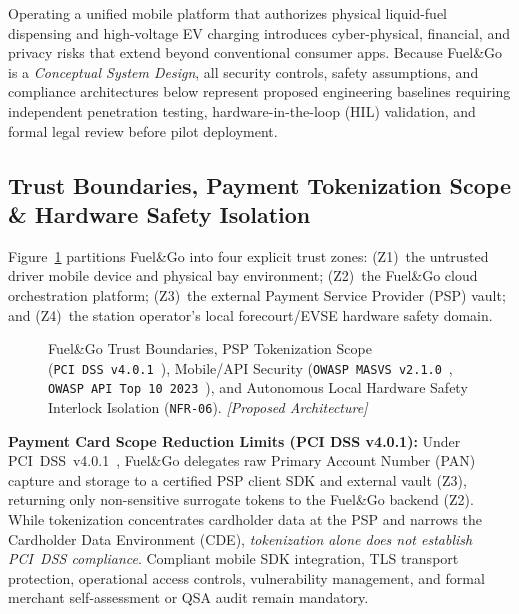 
Operating a unified mobile platform that authorizes physical liquid-fuel dispensing and high-voltage EV charging introduces cyber-physical, financial, and privacy risks that extend beyond conventional consumer apps. Because Fuel\&Go is a \emph{Conceptual System Design}, all security controls, safety assumptions, and compliance architectures below represent proposed engineering baselines requiring independent penetration testing, hardware-in-the-loop (HIL) validation, and formal legal review before pilot deployment.

\subsection{Trust Boundaries, Payment Tokenization Scope \& Hardware Safety Isolation}
Figure~\ref{fig:safety-trust-boundary} partitions Fuel\&Go into four explicit trust zones: (Z1)~the untrusted driver mobile device and physical bay environment; (Z2)~the Fuel\&Go cloud orchestration platform; (Z3)~the external Payment Service Provider (PSP) vault; and (Z4)~the station operator's local forecourt/EVSE hardware safety domain.

\begin{figure}[htbp]
  \centering
  
  \caption{Fuel\&Go Trust Boundaries, PSP Tokenization Scope (\texttt{PCI~DSS~v4.0.1}~\cite{pcissc2024pcidss401}), Mobile/API Security (\texttt{OWASP MASVS~v2.1.0}~\cite{owasp2024masvs}, \texttt{OWASP API Top~10~2023}~\cite{owasp2023apitop10}), and Autonomous Local Hardware Safety Interlock Isolation (\texttt{NFR-06}). \emph{[Proposed Architecture]}}
  \label{fig:safety-trust-boundary}
\end{figure}

\textbf{Payment Card Scope Reduction Limits (PCI DSS v4.0.1):} Under PCI~DSS~v4.0.1~\cite{pcissc2024pcidss401}, Fuel\&Go delegates raw Primary Account Number (PAN) capture and storage to a certified PSP client SDK and external vault (Z3), returning only non-sensitive surrogate tokens to the Fuel\&Go backend (Z2). While tokenization concentrates cardholder data at the PSP and narrows the Cardholder Data Environment (CDE), \emph{tokenization alone does not establish PCI~DSS compliance}. Compliant mobile SDK integration, TLS transport protection, operational access controls, vulnerability management, and formal merchant self-assessment or QSA audit remain mandatory.

